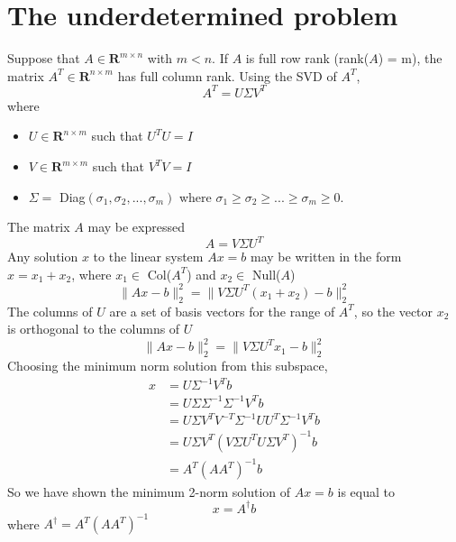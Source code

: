 \documentclass[11pt]{article} %
\begin{document}
\section{The underdetermined problem}
Suppose that $A \in \mathbf{R}^{m \times n}$ with $m < n$. If $A$ is full row rank (rank($A$) = m), the matrix $A^T  \in \mathbf{R}^{n\times m}$ has full column rank. Using the SVD of $A^T$,
\begin{equation}
A^T = U \Sigma V^T
\end{equation}
where
\begin{itemize}
\item $U \in \mathbf{R}^{n\times m}$ such that $U^T U = I$
\item $V \in \mathbf{R}^{m\times m}$ such that $V^T V = I$%
\item $\Sigma =$ Diag$(\sigma_1, \sigma_2, ... , \sigma_m)$ where $\sigma_1 \ge \sigma_2 \ge ... \ge \sigma_m \ge 0$. 
\end{itemize}
The matrix $A$ may be expressed
\begin{equation}
A = V \Sigma U^T
\end{equation}
Any solution $x$ to the linear system $Ax=b$ may be written in the form $x=x_1+x_2$, where $x_1 \in $ Col($A^T$) and $x_2 \in $ Null($A$)
\begin{equation}
\| Ax-b\|_2^2 = \| V \Sigma U^T (x_1 +x_2) -b \|_2^2
\end{equation}
 The columns of $U$ are a set of basis vectors for the range of $A^T$, so the vector $x_2$ is orthogonal to the columns of $U$
\begin{equation}
\| Ax-b\|_2^2 = \| V \Sigma U^T x_1 - b \|_2^2
\end{equation}
Choosing the minimum norm solution from this subspace,
\begin{equation}
\begin{split}
x &= U \Sigma^{-1} V^T b \\
& = U \Sigma \Sigma^{-1} \Sigma^{-1} V^T b \\
& = U \Sigma V^T V^{-T} \Sigma^{-1}  U U^T \Sigma^{-1} V^T b \\
& = U \Sigma V^T( V \Sigma  U^T U \Sigma V^T )^{-1} b \\
& = A^T(A A^T)^{-1} b
\end{split}
\end{equation}
So we have shown the minimum 2-norm solution of $Ax=b$ is equal to
\begin{equation}
\boxed{x = A^\dagger b}
\end{equation}
where $A^\dagger = A^T (A A^T)^{-1}$
\end{document}
